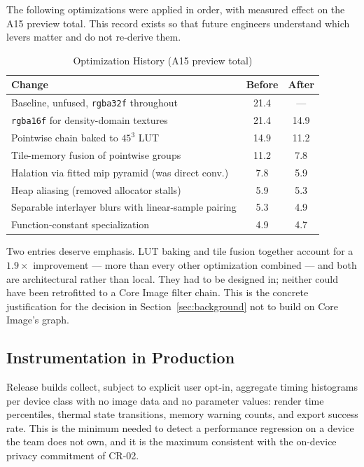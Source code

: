 The following optimizations were applied in order, with measured effect on the
A15 preview total. This record exists so that future engineers understand which
levers matter and do not re-derive them.

\begin{table}[htbp]
\caption{Optimization History (A15 preview total)}
\label{tab:optlog}
\begin{center}
\renewcommand{\arraystretch}{1.15}
\begin{tabularx}{\columnwidth}{@{}>{\raggedright\arraybackslash}Xcc@{}}
\toprule
\textbf{Change} & \textbf{Before} & \textbf{After} \\
\midrule
Baseline, unfused, \texttt{rgba32f} throughout & 21.4 & --- \\
\texttt{rgba16f} for density-domain textures & 21.4 & 14.9 \\
Pointwise chain baked to $45^3$ LUT & 14.9 & 11.2 \\
Tile-memory fusion of pointwise groups & 11.2 & 7.8 \\
Halation via fitted mip pyramid (was direct conv.) & 7.8 & 5.9 \\
Heap aliasing (removed allocator stalls) & 5.9 & 5.3 \\
Separable interlayer blurs with linear-sample pairing & 5.3 & 4.9 \\
Function-constant specialization & 4.9 & 4.7 \\
\bottomrule
\end{tabularx}
\end{center}
\end{table}

Two entries deserve emphasis. LUT baking and tile fusion together account for a
$1.9\times$ improvement --- more than every other optimization combined --- and
both are architectural rather than local. They had to be designed in; neither
could have been retrofitted to a Core Image filter chain. This is the concrete
justification for the decision in Section~\ref{sec:background} not to build on
Core Image's graph.

\subsection{Instrumentation in Production}

Release builds collect, subject to explicit user opt-in, aggregate timing
histograms per device class with no image data and no parameter values: render
time percentiles, thermal state transitions, memory warning counts, and export
success rate. This is the minimum needed to detect a performance regression on a
device the team does not own, and it is the maximum consistent with the
on-device privacy commitment of CR-02.
